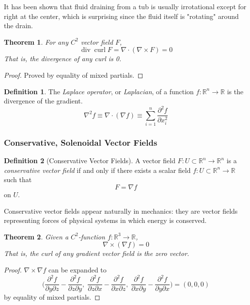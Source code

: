 \documentclass{article}
\DeclareMathOperator{\Div}{div}
\DeclareMathOperator{\curl}{curl}
\newtheorem{theorem}{Theorem}[section]
\theoremstyle{remark}
\theoremstyle{definition}
\newtheorem{definition}{Definition}[section]
\begin{document}
It has been shown that fluid draining from a tub is usually irrotational except for right at the center, which is surprising since the fluid itself is "rotating" around the drain. 

\begin{theorem}
For any $C^2$ vector field $F$, 
\[\Div{\curl{F}} = \nabla\cdot (\nabla \times F) = 0\]
That is, the divergence of any curl is 0. 
\end{theorem}
\begin{proof}
Proved by equality of mixed partials. 
\end{proof}

\begin{definition}
The \textit{Laplace operator}, or \textit{Laplacian}, of a function $f: \mathbb{R}^n \longrightarrow \mathbb{R}$ is the divergence of the gradient. 
\[\nabla^2 f \equiv \nabla \cdot (\nabla f) \equiv \sum_{i=1}^n \frac{\partial^2 f}{\partial x_i^2}\]
\end{definition}

\subsubsection{Conservative, Solenoidal Vector Fields}
\begin{definition}[Conservative Vector Fields]
A vector field $F: U \subset \mathbb{R}^n \longrightarrow \mathbb{R}^n$ is a \textit{conservative vector field} if and only if there exists a scalar field $f: U \subset \mathbb{R}^n \longrightarrow \mathbb{R}$ such that 
\[F = \nabla f\]
on $U$. 
\end{definition}

Conservative vector fields appear naturally in mechanics: they are vector fields representing forces of physical systems in which energy is conserved. 

\begin{theorem}
Given a $C^2$-function $f: \mathbb{R}^3 \longrightarrow \mathbb{R}$,
\[\nabla \times ( \nabla f) = 0\]
That is, the curl of any gradient vector field is the zero vector. 
\end{theorem}
\begin{proof}
$\nabla \times \nabla f$ can be expanded to
\[\bigg( \frac{\partial^2 f}{\partial y \partial z} - \frac{\partial^2 f}{\partial z \partial y}, \; \frac{\partial^2 f}{\partial z \partial x} - \frac{\partial^2 f}{\partial x \partial z}, \; \frac{\partial^2 f}{\partial x \partial y} - \frac{\partial^2 f}{\partial y \partial x}\bigg) = (0, 0, 0)\]
by equality of mixed partials. 
\end{proof}
\end{document}

